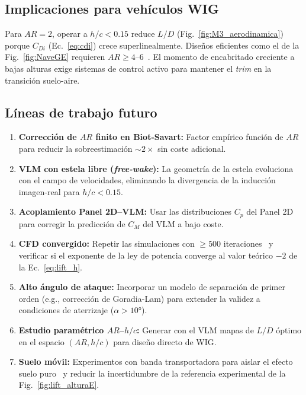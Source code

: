 \documentclass[twocolumn]{article}
\begin{document}
\subsection{Implicaciones para vehículos WIG}

Para $AR = 2$, operar a $h/c < 0.15$ reduce $L/D$ (Fig.~\ref{fig:M3_aerodinamica}) porque $C_{Di}$ (Ec.~\eqref{eq:cdi}) crece superlinealmente. Diseños eficientes como el de la Fig.~\ref{fig:NaveGE} requieren $AR \geq 4$--$6$~\cite{rozhdestvensky2006}. El momento de encabritado creciente a bajas alturas exige sistemas de control activo para mantener el \textit{trim} en la transición suelo-aire.

\subsection{Líneas de trabajo futuro}

\begin{enumerate}
    \item \textbf{Corrección de $AR$ finito en Biot-Savart:} Factor empírico función de $AR$ para reducir la sobreestimación $\sim 2\times$ sin coste adicional.

    \item \textbf{VLM con estela libre (\textit{free-wake}):} La geometría de la estela evoluciona con el campo de velocidades, eliminando la divergencia de la inducción imagen-real para $h/c < 0.15$.

    \item \textbf{Acoplamiento Panel 2D--VLM:} Usar las distribuciones $C_p$ del Panel 2D para corregir la predicción de $C_M$ del VLM a bajo coste.

    \item \textbf{CFD convergido:} Repetir las simulaciones con $\geq 500$ iteraciones~\cite{versteeg2007} y verificar si el exponente de la ley de potencia converge al valor teórico $-2$ de la Ec.~\eqref{eq:lift_h}.

    \item \textbf{Alto ángulo de ataque:} Incorporar un modelo de separación de primer orden (e.g., corrección de Goradia-Lam) para extender la validez a condiciones de aterrizaje ($\alpha > 10°$).

    \item \textbf{Estudio paramétrico $AR$--$h/c$:} Generar con el VLM mapas de $L/D$ óptimo en el espacio $(AR, h/c)$ para diseño directo de WIG.

    \item \textbf{Suelo móvil:} Experimentos con banda transportadora para aislar el efecto suelo puro~\cite{zerihan2000} y reducir la incertidumbre de la referencia experimental de la Fig.~\ref{fig:lift_alturaE}.
\end{enumerate}
\end{document}
